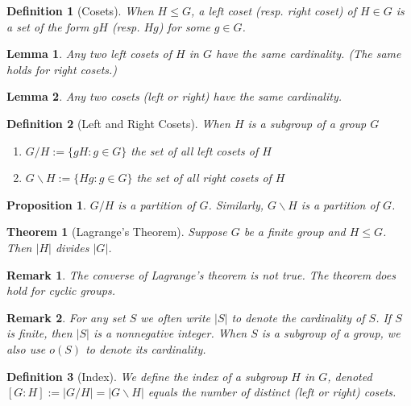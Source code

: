 \documentclass[12pt]{article}
\newtheorem{definition}{Definition}[section]
\newtheorem{theorem}{Theorem}[section]
\newtheorem{lemma}{Lemma}[section]
\newtheorem{proposition}{Proposition}[section]
\newtheorem{remark}{Remark}[section]
\begin{document}
\begin{definition}[Cosets]
    When $H \leq G$, a left coset (resp. right coset) of $H \in G$ is a set of the form $gH$ (resp. $Hg$) for some $g \in G$.
\end{definition}

\begin{lemma}
Any two left cosets of $H$ in $G$ have the same cardinality.  
(The same holds for right cosets.)
\end{lemma}

\begin{lemma}
Any two cosets (left or right) have the same cardinality.  
\end{lemma}

\begin{definition}[Left and Right Cosets]
When $H$ is a subgroup of a group $G$
\begin{enumerate}
    \item $G/H := \{gH: g \in G\}$ the set of all left cosets of $H$ 
    \item $G\backslash H := \{Hg: g \in G\}$ the set of all right cosets of $H$
\end{enumerate}
\end{definition}

\begin{proposition}
$G/H$ is a partition of $G$. Similarly, $G\backslash H$ is a partition of $G$.
\end{proposition}

\begin{theorem}[Lagrange’s Theorem]
Suppose $G$ be a finite group and $H \leq G$. Then $|H|$ divides $|G|$.
\end{theorem}


\begin{remark}
    The converse of Lagrange's theorem is not true. The theorem does hold for cyclic groups.
\end{remark}

\begin{remark}
For any set $S$ we often write $|S|$ to denote the cardinality of $S$. If $S$ is finite, then $|S|$ is a nonnegative integer. When $S$ is a subgroup of a group, we also use $o(S)$ to denote its cardinality.
\end{remark}

\begin{definition}[Index]
We define the \emph{index} of a subgroup $H$ in $G$, denoted $[G : H] := |G/H| = |G\backslash H|$ equals the number of distinct (left or right) cosets. 
\end{definition}
\end{document}
